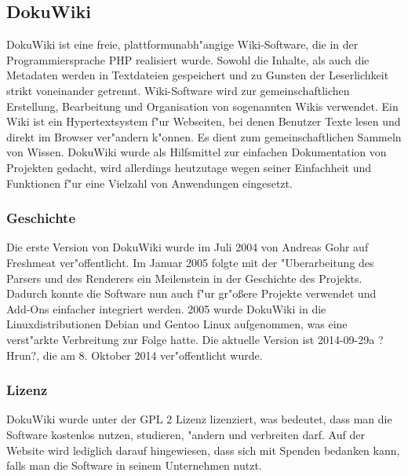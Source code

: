 \subsection*{DokuWiki}
DokuWiki ist eine freie, plattformunabh"angige Wiki-Software, die in der Programmiersprache PHP realisiert wurde. Sowohl die Inhalte, als auch die Metadaten werden in Textdateien gespeichert und zu Gunsten der Leserlichkeit strikt voneinander getrennt. Wiki-Software wird zur gemeinschaftlichen Erstellung, Bearbeitung und Organisation von sogenannten Wikis verwendet. Ein Wiki ist ein Hypertextsystem f"ur Webseiten, bei denen Benutzer Texte lesen und direkt im Browser ver"andern k"onnen. Es dient zum gemeinschaftlichen Sammeln von Wissen. DokuWiki wurde als Hilfsmittel zur einfachen Dokumentation von Projekten gedacht, wird allerdings heutzutage wegen seiner Einfachheit und Funktionen f"ur eine Vielzahl von Anwendungen eingesetzt.
\subsubsection*{Geschichte}
Die erste Version von DokuWiki wurde im Juli 2004 von Andreas Gohr auf Freshmeat ver"offentlicht. Im Januar 2005 folgte mit der "Uberarbeitung des Parsers und des Renderers ein Meilenstein in der Geschichte des Projekts. Dadurch konnte die Software nun auch f"ur gr"oßere Projekte verwendet und Add-Ons einfacher integriert werden. 2005 wurde DokuWiki in die Linuxdistributionen Debian und Gentoo Linux aufgenommen, was eine verst"arkte Verbreitung zur Folge hatte. Die aktuelle Version ist 2014-09-29a ?Hrun?, die am 8. Oktober 2014 ver"offentlicht wurde.
\subsubsection*{Lizenz}
DokuWiki wurde unter der GPL 2 Lizenz lizenziert, was bedeutet, dass man die Software kostenlos nutzen, studieren, "andern und verbreiten darf. Auf der Website wird lediglich darauf hingewiesen, dass sich mit Spenden bedanken kann, falls man die Software in seinem Unternehmen nutzt.
